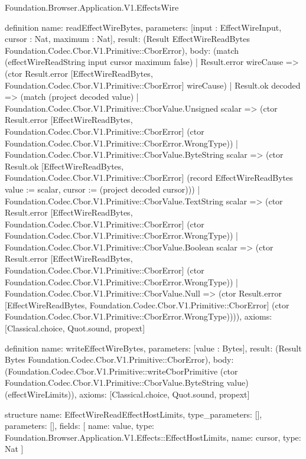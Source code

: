 \begin{lexlean}{Foundation.Browser.Application.V1.EffectsWire}
\begin{semanticmodule}
definition{
  name: readEffectWireBytes,
  parameters: [input : EffectWireInput, cursor : Nat, maximum : Nat],
  result: (Result EffectWireReadBytes Foundation.Codec.Cbor.V1.Primitive::CborError),
  body: (match (effectWireReadString input cursor maximum false)
    | Result.error wireCause => (ctor Result.error [EffectWireReadBytes, Foundation.Codec.Cbor.V1.Primitive::CborError] wireCause)
    | Result.ok decoded => (match (project decoded value)
      | Foundation.Codec.Cbor.V1.Primitive::CborValue.Unsigned scalar => (ctor Result.error [EffectWireReadBytes, Foundation.Codec.Cbor.V1.Primitive::CborError] (ctor Foundation.Codec.Cbor.V1.Primitive::CborError.WrongType))
      | Foundation.Codec.Cbor.V1.Primitive::CborValue.ByteString scalar => (ctor Result.ok [EffectWireReadBytes, Foundation.Codec.Cbor.V1.Primitive::CborError] (record EffectWireReadBytes {value := scalar, cursor := (project decoded cursor)}))
      | Foundation.Codec.Cbor.V1.Primitive::CborValue.TextString scalar => (ctor Result.error [EffectWireReadBytes, Foundation.Codec.Cbor.V1.Primitive::CborError] (ctor Foundation.Codec.Cbor.V1.Primitive::CborError.WrongType))
      | Foundation.Codec.Cbor.V1.Primitive::CborValue.Boolean scalar => (ctor Result.error [EffectWireReadBytes, Foundation.Codec.Cbor.V1.Primitive::CborError] (ctor Foundation.Codec.Cbor.V1.Primitive::CborError.WrongType))
      | Foundation.Codec.Cbor.V1.Primitive::CborValue.Null => (ctor Result.error [EffectWireReadBytes, Foundation.Codec.Cbor.V1.Primitive::CborError] (ctor Foundation.Codec.Cbor.V1.Primitive::CborError.WrongType)))),
  axioms: [Classical.choice, Quot.sound, propext]
}

definition{
  name: writeEffectWireBytes,
  parameters: [value : Bytes],
  result: (Result Bytes Foundation.Codec.Cbor.V1.Primitive::CborError),
  body: (Foundation.Codec.Cbor.V1.Primitive::writeCborPrimitive (ctor Foundation.Codec.Cbor.V1.Primitive::CborValue.ByteString value) (effectWireLimits)),
  axioms: [Classical.choice, Quot.sound, propext]
}

structure{
  name: EffectWireReadEffectHostLimits,
  type_parameters: [],
  parameters: [],
  fields: [
    {name: value, type: Foundation.Browser.Application.V1.Effects::EffectHostLimits},
    {name: cursor, type: Nat}
  ]
}


\end{semanticmodule}
\end{lexlean}
